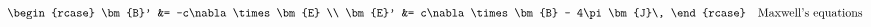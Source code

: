 \begin{equation*}
  \begin{rcase}
  \bm{B}' &= -c\nabla\times\bm{E}            \\
  \bm{E}' &= c\nabla\times\bm{B} - 4\pi\bm{J}\,
  \end{rcase}
  \quad \text {Maxwell's equations}
\end{equation*}